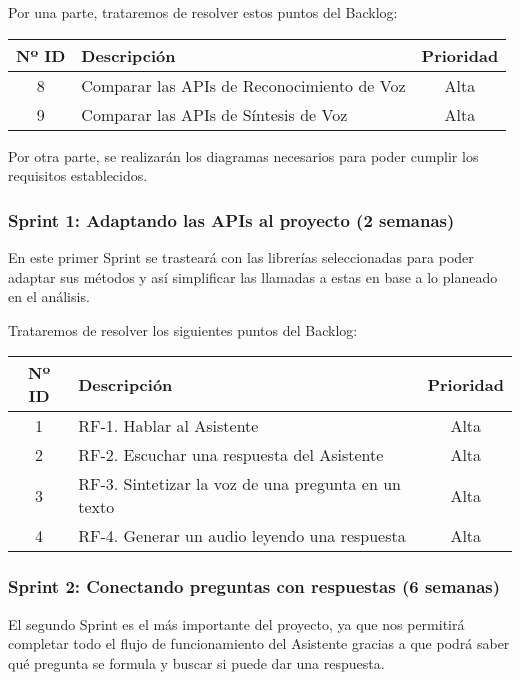 Por una parte, trataremos de resolver estos puntos del Backlog:

\begin{table}[H]
	\begin{tabularx}{\textwidth}{|c|X|c|}
		\hline
		\textbf{Nº ID} & \textbf{Descripción} & \textbf{Prioridad} \\
		\hline
		8 &  Comparar las APIs de Reconocimiento de Voz & Alta \\
		\hline
		9 &  Comparar las APIs de Síntesis de Voz & Alta \\
		\hline
	\end{tabularx}
\end{table}

Por otra parte, se realizarán los diagramas necesarios para poder cumplir los requisitos establecidos.

\subsubsection{Sprint 1: Adaptando las APIs al proyecto (2 semanas)}
En este primer Sprint se trasteará con las librerías seleccionadas para poder adaptar sus métodos y así simplificar las llamadas a estas en base a lo planeado en el análisis.

Trataremos de resolver los siguientes puntos del Backlog:

\begin{table}[H]
	\begin{tabularx}{\textwidth}{|c|X|c|}
		\hline
		\textbf{Nº ID} & \textbf{Descripción} & \textbf{Prioridad} \\
		\hline
		1 & RF-1. Hablar al Asistente & Alta \\
		\hline
		2 & RF-2. Escuchar una respuesta del Asistente & Alta \\
		\hline
		3 & RF-3. Sintetizar la voz de una pregunta en un texto & Alta \\
		\hline
		4 & RF-4. Generar un audio leyendo una respuesta & Alta \\
		\hline
	\end{tabularx}
\end{table}

\subsubsection{Sprint 2: Conectando preguntas con respuestas (6 semanas)}
El segundo Sprint es el más importante del proyecto, ya que nos permitirá completar todo el flujo de funcionamiento del Asistente gracias a que podrá saber qué pregunta se formula y buscar si puede dar una respuesta.

